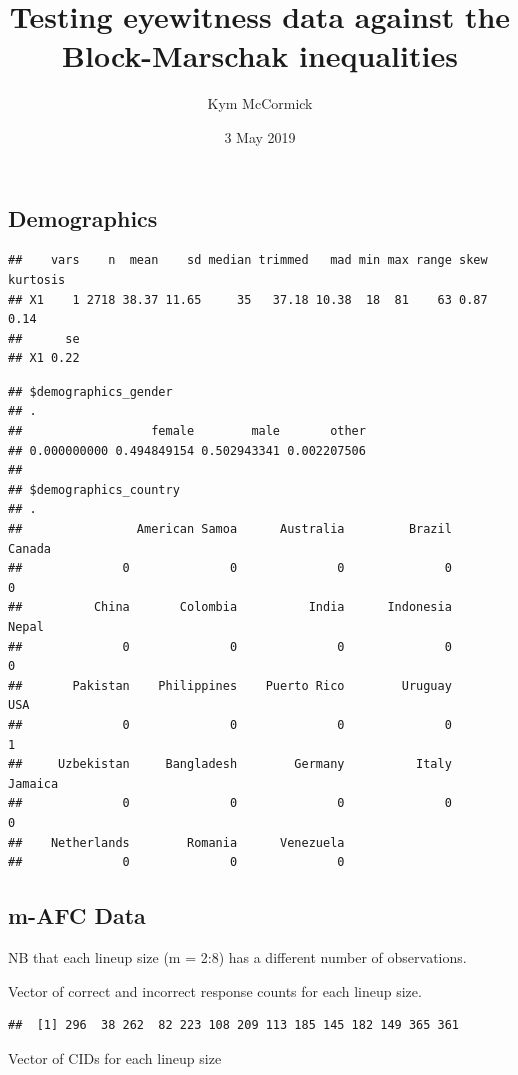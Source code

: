 \documentclass[]{article}
\title{Testing eyewitness data against the Block-Marschak inequalities}
\author{Kym McCormick}
\date{3 May 2019}
\begin{document}
\maketitle

\subsection{Demographics}\label{demographics}

\begin{verbatim}
##    vars    n  mean    sd median trimmed   mad min max range skew kurtosis
## X1    1 2718 38.37 11.65     35   37.18 10.38  18  81    63 0.87     0.14
##      se
## X1 0.22
\end{verbatim}

\begin{verbatim}
## $demographics_gender
## .
##                  female        male       other 
## 0.000000000 0.494849154 0.502943341 0.002207506 
## 
## $demographics_country
## .
##                American Samoa      Australia         Brazil         Canada 
##              0              0              0              0              0 
##          China       Colombia          India      Indonesia          Nepal 
##              0              0              0              0              0 
##       Pakistan    Philippines    Puerto Rico        Uruguay            USA 
##              0              0              0              0              1 
##     Uzbekistan     Bangladesh        Germany          Italy        Jamaica 
##              0              0              0              0              0 
##    Netherlands        Romania      Venezuela 
##              0              0              0
\end{verbatim}

\subsection{m-AFC Data}\label{m-afc-data}

NB that each lineup size (m = 2:8) has a different number of
observations.

Vector of correct and incorrect response counts for each lineup size.

\begin{verbatim}
##  [1] 296  38 262  82 223 108 209 113 185 145 182 149 365 361
\end{verbatim}

Vector of CIDs for each lineup size
\end{document}
